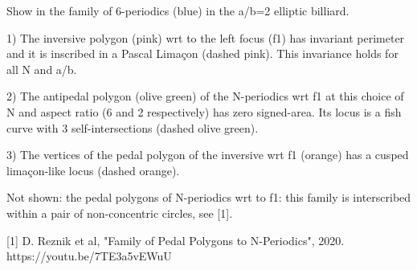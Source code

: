 Show in the family of 6-periodics (blue) in the a/b=2 elliptic billiard.

1) The inversive polygon (pink) wrt to the left focus (f1) has invariant perimeter and it is inscribed in a Pascal Limaçon (dashed pink). This invariance holds for all N and a/b.

2) The antipedal polygon (olive green) of the N-periodics wrt f1 at this choice of N and aspect ratio (6 and 2 respectively) has zero signed-area. Its locus is a fish curve with 3 self-intersections (dashed olive green).

3) The vertices of the pedal polygon of the inversive wrt f1 (orange) has a cusped limaçon-like locus (dashed orange).

Not shown: the pedal polygons of N-periodics wrt to f1: this family is interscribed within a pair of non-concentric circles, see [1].

[1] D. Reznik et al, "Family of Pedal Polygons to N-Periodics", 2020. https://youtu.be/7TE3a5vEWuU